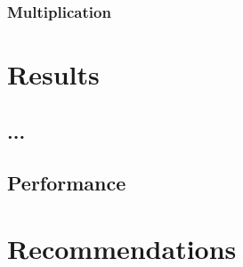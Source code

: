 \documentclass[a4paper,11pt]{kth-mag}
\begin{document}
\subsection{Multiplication}

\chapter{Results}
\label{ch:results}

\section{...}


\section{Performance}

\chapter{Recommendations}
\label{ch:recommendations}



\end{document}
